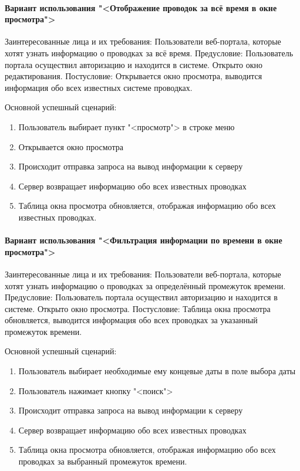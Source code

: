 \paragraph{Вариант использования "<Отображение проводок за всё время в окне просмотра">}
Заинтересованные лица и их требования: Пользователи веб-портала, которые хотят узнать информацию о проводках за всё время.
Предусловие: Пользователь портала осуществил авторизацию и находится в системе. Открыто окно редактирования.
Постусловие: Открывается окно просмотра, выводится информация обо всех известных системе проводках.

Основной успешный сценарий:
\begin{enumerate}
	\item Пользователь выбирает пункт "<просмотр"> в строке меню
	\item Открывается окно просмотра
	\item Происходит отправка запроса на вывод информации к серверу 
	\item Сервер возвращает информацию обо всех известных проводках
	\item Таблица окна просмотра обновляется, отображая информацию обо всех известных проводках.
\end{enumerate}

\paragraph{Вариант использования "<Фильтрация информации по времени в окне просмотра">}
Заинтересованные лица и их требования: Пользователи веб-портала, которые хотят узнать информацию о проводках за определённый промежуток времени.
Предусловие: Пользователь портала осуществил авторизацию и находится в системе. Открыто окно просмотра.
Постусловие: Таблица окна просмотра обновляется, выводится информация обо всех проводках за указанный промежуток времени.

Основной успешный сценарий:
\begin{enumerate}
	\item Пользователь выбирает необходимые ему концевые даты в поле выбора даты
	\item Пользователь нажимает кнопку "<поиск">
	\item Происходит отправка запроса на вывод информации к серверу 
	\item Сервер возвращает информацию обо всех известных проводках
	\item Таблица окна просмотра обновляется, отображая информацию обо всех проводках за выбранный промежуток времени.
\end{enumerate}

